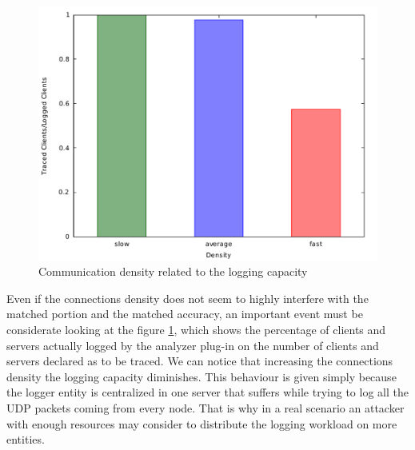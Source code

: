 \begin{figure}
	\centering
	\includegraphics[scale=0.35]{graphs/density_clients_ration.pdf}
	\caption{Communication density related to the logging capacity}
	\label{fig:g_density}
\end{figure}

Even if the connections density does not seem to highly interfere with
the matched portion and the matched accuracy, an important event must be
considerate looking at the figure \ref{fig:g_density}, which shows the
percentage of clients and servers actually logged by the analyzer plug-in on the
number of clients and servers declared as to be traced. We can notice
that increasing the connections density the logging capacity diminishes.
This behaviour is given simply because the logger entity is centralized
in one server that suffers while trying to log all the UDP packets
coming from every node. That is why in a real
scenario an attacker with enough resources may consider to distribute 
the logging workload on more
entities.

